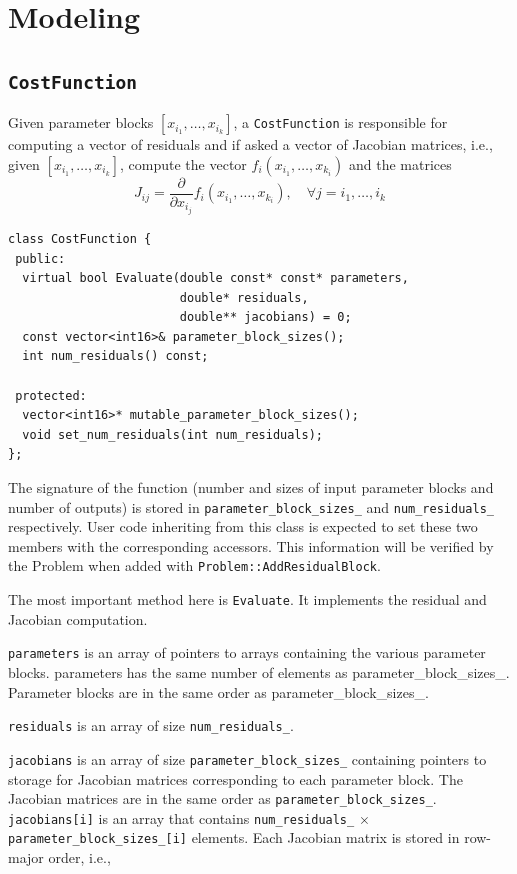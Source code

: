 \chapter{Modeling}
\label{chapter:api}
\section{\texttt{CostFunction}}
Given parameter blocks $\left[x_{i_1}, \hdots , x_{i_k}\right]$, a \texttt{CostFunction} is responsible for computing
a vector of residuals and if asked a vector of Jacobian matrices, i.e., given $\left[x_{i_1}, \hdots , x_{i_k}\right]$, compute the vector $f_i\left(x_{i_1},\hdots,x_{k_i}\right)$ and the matrices
\begin{equation}
J_{ij} = \frac{\partial}{\partial x_{i_j}}f_i\left(x_{i_1},\hdots,x_{k_i}\right),\quad \forall j = i_1,\hdots, i_k
\end{equation}
\begin{verbatim}
class CostFunction {
 public:
  virtual bool Evaluate(double const* const* parameters,
                        double* residuals,
                        double** jacobians) = 0;
  const vector<int16>& parameter_block_sizes();
  int num_residuals() const;

 protected:
  vector<int16>* mutable_parameter_block_sizes();
  void set_num_residuals(int num_residuals);
};
\end{verbatim}

The signature of the function (number and sizes of input parameter blocks and number of outputs)
is stored in \texttt{parameter\_block\_sizes\_} and \texttt{num\_residuals\_} respectively. User
code inheriting from this class is expected to set these two members with the
corresponding accessors. This information will be verified by the Problem
when added with \texttt{Problem::AddResidualBlock}.

The most important method here is \texttt{Evaluate}. It implements the residual and Jacobian computation.

\texttt{parameters}  is an array of pointers to arrays containing the various parameter blocks. parameters has the same number of elements as parameter\_block\_sizes\_.  Parameter blocks are in the same order as parameter\_block\_sizes\_.


\texttt{residuals} is an array of size \texttt{num\_residuals\_}.


\texttt{jacobians} is an array of size \texttt{parameter\_block\_sizes\_} containing pointers to storage for Jacobian matrices corresponding to each parameter block. The Jacobian matrices are in the same order as \texttt{parameter\_block\_sizes\_}. \texttt{jacobians[i]} is an array that contains \texttt{num\_residuals\_} $\times$ \texttt{parameter\_block\_sizes\_[i]} elements. Each Jacobian matrix is stored in row-major order, i.e.,

